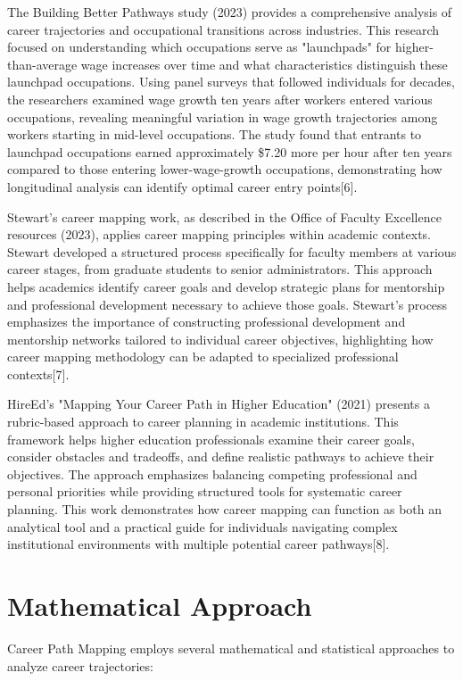 \documentclass{article}
\begin{document}
The Building Better Pathways study (2023) provides a comprehensive analysis of career trajectories and occupational transitions across industries. This research focused on understanding which occupations serve as "launchpads" for higher-than-average wage increases over time and what characteristics distinguish these launchpad occupations. Using panel surveys that followed individuals for decades, the researchers examined wage growth ten years after workers entered various occupations, revealing meaningful variation in wage growth trajectories among workers starting in mid-level occupations. The study found that entrants to launchpad occupations earned approximately \$7.20 more per hour after ten years compared to those entering lower-wage-growth occupations, demonstrating how longitudinal analysis can identify optimal career entry points[6].

Stewart's career mapping work, as described in the Office of Faculty Excellence resources (2023), applies career mapping principles within academic contexts. Stewart developed a structured process specifically for faculty members at various career stages, from graduate students to senior administrators. This approach helps academics identify career goals and develop strategic plans for mentorship and professional development necessary to achieve those goals. Stewart's process emphasizes the importance of constructing professional development and mentorship networks tailored to individual career objectives, highlighting how career mapping methodology can be adapted to specialized professional contexts[7].

HireEd's "Mapping Your Career Path in Higher Education" (2021) presents a rubric-based approach to career planning in academic institutions. This framework helps higher education professionals examine their career goals, consider obstacles and tradeoffs, and define realistic pathways to achieve their objectives. The approach emphasizes balancing competing professional and personal priorities while providing structured tools for systematic career planning. This work demonstrates how career mapping can function as both an analytical tool and a practical guide for individuals navigating complex institutional environments with multiple potential career pathways[8].

\section{Mathematical Approach}

Career Path Mapping employs several mathematical and statistical approaches to analyze career trajectories:
\end{document}
